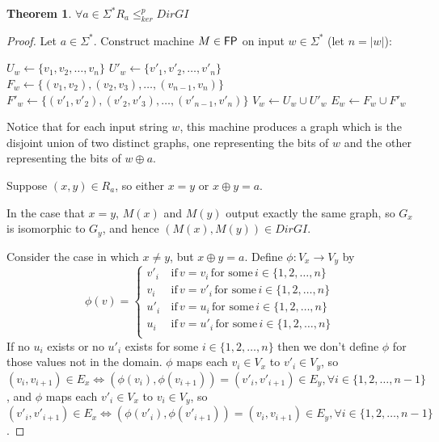\documentclass[draft]{article}
\newtheorem{theorem}{Theorem}%
\theoremstyle{definition}
\newcommand{\plain}[1]{\,\text{#1}\,} %
\newcommand{\sigmastar}{\Sigma^{*}}
\newcommand{\kr}{\leq^{p}_{ker}} %
\begin{document}
\begin{theorem}\label{thm:ra_kr_dirgi}$\forall a\in\sigmastar R_a \kr DirGI$
\end{theorem}
\begin{proof}
  Let $a\in\sigmastar$. Construct machine $M\in{\ensuremath{\mathsf{FP}}}$ on input $w\in\sigmastar$
  (let $n=|w|$):\\
  \begin{algorithm}[H]
    $U_w\gets\{v_1, v_2, \ldots, v_n\}$\;
    $U'_w\gets\{v'_1, v'_2, \ldots, v'_n\}$\;
    $F_w\gets\{(v_1, v_2), (v_2, v_3), \ldots, (v_{n-1},
    v_n)\}$\;
    $F'_w\gets\{(v'_1, v'_2), (v'_2, v'_3), \ldots, (v'_{n-1},
    v'_n)\}$\;
    $V_w\gets U_w\cup U'_w$\;
    $E_w\gets F_w\cup F'_w$\;
  \end{algorithm}
  Notice that for each input string $w$, this machine produces a graph which is
  the disjoint union of two distinct graphs, one representing the bits of $w$
  and the other representing the bits of $w\oplus a$.
  
  Suppose $(x,y)\in R_a$, so either $x=y$ or $x\oplus y=a$.
  
  In the case that $x=y$, $M(x)$ and $M(y)$ output exactly the same graph, so
  $G_x$ is isomorphic to $G_y$, and hence $(M(x), M(y))\in DirGI$.
  
  Consider the case in which $x\neq y$, but $x\oplus y=a$. Define $\phi:V_x\to
  V_y$ by
  \begin{displaymath}
    \phi(v)=
    \begin{cases}
      v'_i & \plain{if} v=v_i \plain{for some} i\in\{1, 2, \ldots, n\}\\
      v_i & \plain{if} v=v'_i \plain{for some} i\in\{1, 2, \ldots, n\}\\
      u'_i & \plain{if} v=u_i \plain{for some} i\in\{1, 2, \ldots, n\}\\
      u_i & \plain{if} v=u'_i \plain{for some} i\in\{1, 2, \ldots, n\}\\
    \end{cases}
  \end{displaymath}
  If no $u_i$ exists or no $u'_i$ exists for some $i\in\{1, 2, \ldots, n\}$
  then we don't define $\phi$ for those values not in the domain. $\phi$ maps
  each $v_i\in V_x$ to $v'_i\in V_y$, so $(v_i, v_{i+1})\in E_x \iff
  (\phi(v_i), \phi(v_{i+1}))=(v'_i, v'_{i+1})\in E_y, \forall i\in\{1, 2,
  \ldots, n-1\}$, and $\phi$ maps each $v'_i\in V_x$ to $v_i\in V_y$, so
  $(v'_i, v'_{i+1})\in E_x \iff (\phi(v'_i), \phi(v'_{i+1}))=(v_i, v_{i+1})\in
  E_y, \forall i\in\{1, 2, \ldots, n-1\}$.


\end{proof}
\end{document}

